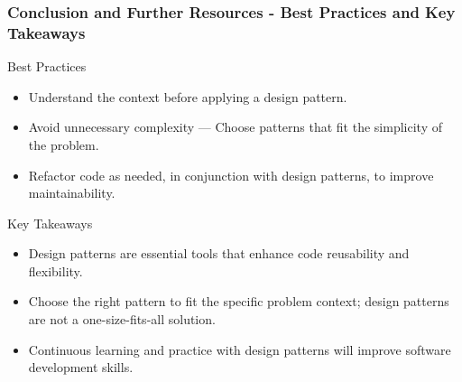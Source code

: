 \documentclass{beamer}
\begin{document}
\begin{frame}[fragile]
    \frametitle{Conclusion and Further Resources - Best Practices and Key Takeaways}

    \begin{block}{Best Practices}
        \begin{itemize}
            \item Understand the context before applying a design pattern.
            \item Avoid unnecessary complexity — Choose patterns that fit the simplicity of the problem.
            \item Refactor code as needed, in conjunction with design patterns, to improve maintainability.
        \end{itemize}
    \end{block}

    \begin{block}{Key Takeaways}
        \begin{itemize}
            \item Design patterns are essential tools that enhance code reusability and flexibility.
            \item Choose the right pattern to fit the specific problem context; design patterns are not a one-size-fits-all solution.
            \item Continuous learning and practice with design patterns will improve software development skills.
        \end{itemize}
    \end{block}
\end{frame}
\end{document}
